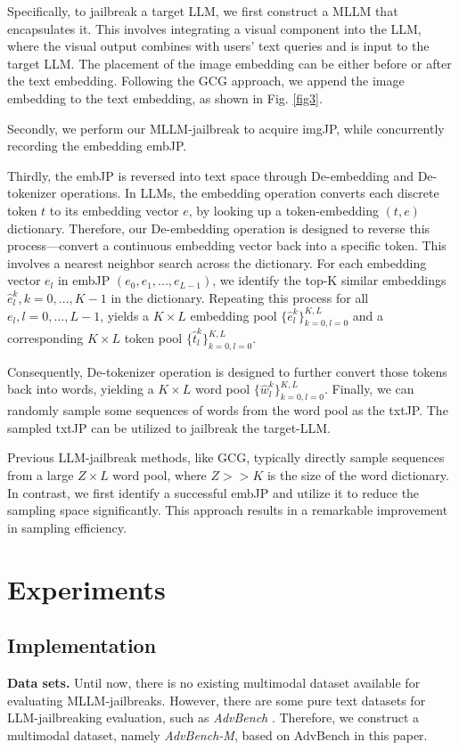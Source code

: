 Specifically, to jailbreak a target LLM, we first construct a MLLM that encapsulates it. This involves integrating a visual component into the LLM, where the visual output combines with users' text queries and is input to the target LLM. The placement of the image embedding can be either before or after the text embedding. Following the GCG \cite{zou2023universal} approach, we append the image embedding to the text embedding, as shown in Fig. \ref{fig3}.

Secondly, we perform our MLLM-jailbreak to acquire imgJP, while concurrently recording the embedding embJP. 

Thirdly, the embJP is reversed into text space through De-embedding and De-tokenizer operations. In LLMs, the embedding operation converts each discrete token $t$ to its embedding vector $e$, by looking up a token-embedding $(t, e)$ dictionary. Therefore, our De-embedding operation is designed to reverse this process—convert a continuous embedding vector back into a specific token. This involves a nearest neighbor search across the dictionary. For each embedding vector $e_l$ in embJP $(e_0, e_1, ..., e_{L-1})$, we identify the top-K similar embeddings $\hat{e}^k_l, k=0,...,K-1$ in the dictionary. Repeating this process for all $e_l, l=0,...,L-1$, yields a $K\times L$ embedding pool $\{\hat{e}_l^k\}_{k=0,l=0}^{K, L}$ and a corresponding $K\times L$ token pool $\{\hat{t}_l^k\}_{k=0,l=0}^{K,L}$. 

Consequently, De-tokenizer operation is designed to further convert those tokens back into words, yielding a $K\times L$ word pool $\{\hat{w}_l^k\}_{k=0,l=0}^{K,L}$. Finally, we can randomly sample some sequences of words from the word pool as the txtJP. The sampled txtJP can be utilized to jailbreak the target-LLM. 

Previous LLM-jailbreak methods, like GCG, typically directly sample sequences from a large $Z\times L$ word pool, where $Z>>K$ is the size of the word dictionary. In contrast, we first identify a successful embJP and utilize it to reduce the sampling space significantly. This approach results in a remarkable improvement in sampling efficiency.

\section{Experiments}
\subsection{Implementation}
\label{sec:Implementation}
\noindent\textbf{Data sets. }
Until now, there is no existing multimodal dataset available for evaluating MLLM-jailbreaks. However, there are some pure text datasets for LLM-jailbreaking evaluation, such as \emph{AdvBench} \cite{zou2023universal}. Therefore, we construct a multimodal dataset, namely \emph{AdvBench-M}, based on AdvBench in this paper. 

